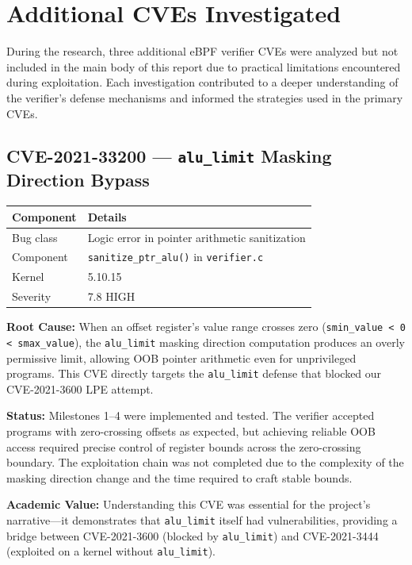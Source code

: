 \chapter{Additional CVEs Investigated}

During the research, three additional eBPF verifier CVEs were analyzed but not included in the main body of this report due to practical limitations encountered during exploitation. Each investigation contributed to a deeper understanding of the verifier's defense mechanisms and informed the strategies used in the primary CVEs.

\section{CVE-2021-33200 — \texttt{alu\_limit} Masking Direction Bypass}

\begin{table}[H]
\centering
\begin{tabular}{@{}ll@{}}
\toprule
\textbf{Component} & \textbf{Details} \\
\midrule
Bug class & Logic error in pointer arithmetic sanitization \\
Component & \texttt{sanitize\_ptr\_alu()} in \texttt{verifier.c} \\
Kernel & 5.10.15 \\
Severity & 7.8 HIGH \\
\bottomrule
\end{tabular}
\end{table}

\textbf{Root Cause:} When an offset register's value range crosses zero (\texttt{smin\_value < 0 < smax\_value}), the \texttt{alu\_limit} masking direction computation produces an overly permissive limit, allowing OOB pointer arithmetic even for unprivileged programs. This CVE directly targets the \texttt{alu\_limit} defense that blocked our CVE-2021-3600 LPE attempt.

\textbf{Status:} Milestones 1--4 were implemented and tested. The verifier accepted programs with zero-crossing offsets as expected, but achieving reliable OOB access required precise control of register bounds across the zero-crossing boundary. The exploitation chain was not completed due to the complexity of the masking direction change and the time required to craft stable bounds.

\textbf{Academic Value:} Understanding this CVE was essential for the project's narrative—it demonstrates that \texttt{alu\_limit} itself had vulnerabilities, providing a bridge between CVE-2021-3600 (blocked by \texttt{alu\_limit}) and CVE-2021-3444 (exploited on a kernel without \texttt{alu\_limit}).


